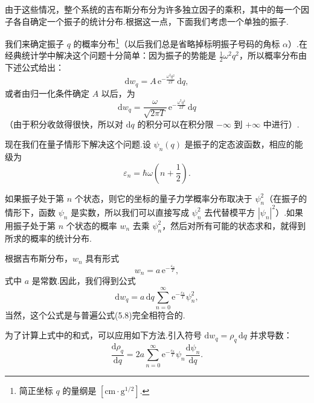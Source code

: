 由于这些情况，整个系统的吉布斯分布分为许多独立因子的乘积，其中的每一个因子各自确定一个振子的统计分布.根据这一点，下面我们考虑一个单独的振子.

我们来确定振子 $q$ 的概率分布\footnote{简正坐标 $q$ 的量纲是 $[\mathrm{cm}\cdot\mathrm{g}^{1/2}]$.}（以后我们总是省略掉标明振子号码的角标 $\alpha$）.在经典统计学中解决这个问题十分简单：因为振子的势能是 $\frac{1}{2}\omega^2q^2$，所以概率分布由下述公式给出：
\begin{equation*}
  \mathrm{d}w_q=A\,\mathrm{e}^{-\frac{\omega^2q^2}{2T}}\,\mathrm{d}q,
\end{equation*}
或者由归一化条件确定 $A$ 以后，为
\begin{equation}
  \mathrm{d}w_q=\frac{\omega}{\sqrt{2\pi T}}\,\mathrm{e}^{-\frac{\omega^2q^2}{2T}}\,\mathrm{d}q
\end{equation}
（由于积分收敛得很快，所以对 $\mathrm{d}q$ 的积分可以在积分限 $-\infty$ 到 $+\infty$ 中进行）.

现在我们在量子情形下解决这个问题.设 $\psi_n(q)$ 是振子的定态波函数，相应的能级为
\begin{equation*}
  \varepsilon_n=\hbar\omega\left(n+\frac{1}{2}\right).
\end{equation*}

如果振子处于第 $n$ 个状态，则它的坐标的量子力学概率分布取决于 $\psi_n^2$（在振子的情形下，函数 $\psi_n$ 是实数，所以我们可以直接写成 $\psi_n^2$ 去代替模平方 $|\psi_n|^2$）.如果用振子处于第 $n$ 个状态的概率 $w_n$ 去乘 $\psi_n^2$，然后对所有可能的状态求和，就得到所求的概率的统计分布.

根据吉布斯分布，$w_n$ 具有形式
\begin{equation*}
  w_n=a\,\mathrm{e}^{-\frac{\varepsilon_n}{T}},
\end{equation*}
式中 $a$ 是常数.因此，我们得到公式
\begin{equation}
  \mathrm{d}w_q=a\,\mathrm{d}q\sum_{n=0}^{\infty}\mathrm{e}^{-\frac{\varepsilon_n}{T}}\psi_n^2,
\end{equation}
当然，这个公式是与普遍公式(5.8)完全相符合的.

为了计算上式中的和式，可以应用如下方法.引入符号 $\mathrm{d}w_q=\rho_q\,\mathrm{d}q$ 并求导数：
\begin{equation*}
  \frac{\mathrm{d}\rho_q}{\mathrm{d}q}=2a\sum_{n=0}^{\infty}\mathrm{e}^{-\frac{\varepsilon_n}{T}}\psi_n\frac{\mathrm{d}\psi_n}{\mathrm{d}q}.
\end{equation*}

